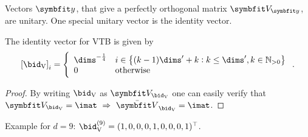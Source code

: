 Vectors $\vc y$, that give a perfectly orthogonal matrix $\mat V_{\vc y}$, are unitary.
One special unitary vector is the identity vector.
\begin{corollary}
    The identity vector for VTB is given by
    \begin{equation}
        \sbr{\bid_{\ped{V}}}_i = \left\{ \begin{array}{ll}
                \dims^{-\frac{1}{4}} & i \in \cbr{(k - 1) \dims' + k : k \leq \dims', k \in \mathbb{N}_{>0}} \\
                0 & \text{otherwise}
        \end{array}\right. \text{.}
    \end{equation}
    \begin{proof}
        By writing $\bid_{\ped{V}}$ as $\mat V_{\bid_{\ped{V}}}$ one can easily verify that $\mat V_{\bid_{\ped{V}}} = \imat\ \Rightarrow\ \bar{\mat V}_{\bid_{\ped{V}}} = \imat$.
    \end{proof}
\end{corollary}
\noindent Example for $d = 9$: $\bid_{\ped{V}}^{(9)} = (1, 0, 0, 0, 1, 0, 0, 0, 1)\Tr$.

